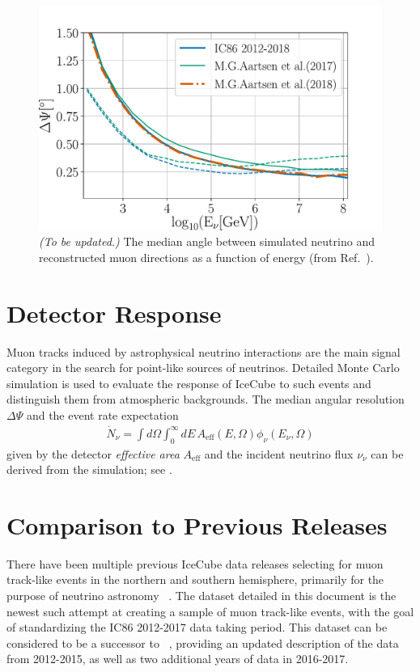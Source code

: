 \documentclass[aps,10pt,prd,twocolumn,floats,letterpaper,showpacs,nofootinbib,bibnotes,notitlepage,superscriptaddress,floatfix]{revtex4-1}
\newcommand{\MA}[1]{{\color{magenta}#1}}
\begin{document}
\begin{figure}[t]
\centering
\includegraphics[width=\linewidth]{IC86II_PSF.pdf}
\caption[]{\MA{\it (To be updated.)} The median angle between simulated neutrino and reconstructed muon directions as a function of energy (from Ref.~\cite{Aartsen:2019fau}).}\label{fig:PSF}
\end{figure}

\section{Detector Response}

Muon tracks induced by astrophysical neutrino interactions are the main signal category in the search for point-like sources of neutrinos. Detailed Monte Carlo simulation is used to evaluate the response of IceCube to such events and distinguish them from atmospheric backgrounds. The median angular resolution $\Delta\Psi$ and the event rate expectation
\begin{align}\label{eq:ev_rate}
\dot{N}_\nu=\int d\Omega\int_0^\infty dE\,A_\mathrm{eff}\left(E, \Omega\right) \phi_\nu\left(E_\nu,\Omega\right)
\end{align}
given by the detector \emph{effective area} $A_\mathrm{eff}$ and the incident neutrino flux $\nu_\nu$ can be derived from the simulation; see \cite{Aartsen:2016xlq}.

\section{Comparison to Previous Releases}
There have been multiple previous IceCube data releases selecting for muon track-like events in the northern and southern hemisphere, primarily for the purpose of neutrino astronomy ~\cite{Abbasi:2010rd,Aartsen:2013uuv,IceCube:2018,IceCube:2019,IceCube:TXS2018}. The dataset detailed in this document is the newest such attempt at creating a sample of muon track-like events, with the goal of standardizing the IC86 2012-2017 data taking period. This dataset can be considered to be a successor to ~\cite{IceCube:2019}, providing an updated description of the data from 2012-2015, as well as two additional years of data in 2016-2017. 
\end{document}
